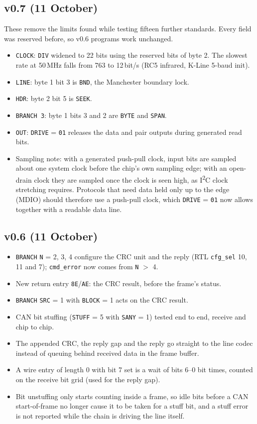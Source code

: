 \documentclass[11pt,a4paper]{article}
\newcommand{\sig}[1]{\texttt{#1}}
\begin{document}
\subsection{v0.7 (11 October)}

These remove the limits found while testing fifteen further standards. Every field was reserved before, so v0.6 programs work unchanged.

\begin{itemize}
\item \sig{CLOCK}: \sig{DIV} widened to 22 bits using the reserved bits of byte 2. The slowest rate at 50\,MHz falls from 763 to 12\,bit/s (RC5 infrared, K-Line 5-baud init).
\item \sig{LINE}: byte 1 bit 3 is \sig{BND}, the Manchester boundary lock.
\item \sig{HDR}: byte 2 bit 5 is \sig{SEEK}.
\item \sig{BRANCH 3}: byte 1 bits 3 and 2 are \sig{BYTE} and \sig{SPAN}.
\item \sig{OUT}: \sig{DRIVE} = \texttt{01} releases the data and pair outputs during generated read bits.
\item Sampling note: with a generated push-pull clock, input bits are sampled about one system clock before the chip's own sampling edge; with an open-drain clock they are sampled once the clock is seen high, as I\textsuperscript{2}C clock stretching requires. Protocols that need data held only up to the edge (MDIO) should therefore use a push-pull clock, which \sig{DRIVE} = \texttt{01} now allows together with a readable data line.
\end{itemize}

\subsection{v0.6 (11 October)}

\begin{itemize}
\item \sig{BRANCH} \sig{N} = 2, 3, 4 configure the CRC unit and the reply (RTL \sig{cfg\_sel} 10, 11 and 7); \sig{cmd\_error} now comes from \sig{N} $>$ 4.
\item New return entry \texttt{8E}/\texttt{AE}: the CRC result, before the frame's status.
\item \sig{BRANCH} \sig{SRC} = 1 with \sig{BLOCK} = 1 acts on the CRC result.
\item CAN bit stuffing (\sig{STUFF} = 5 with \sig{SANY} = 1) tested end to end, receive and chip to chip.
\item The appended CRC, the reply gap and the reply go straight to the line codec instead of queuing behind received data in the frame buffer.
\item A wire entry of length 0 with bit 7 set is a wait of bits 6--0 bit times, counted on the receive bit grid (used for the reply gap).
\item Bit unstuffing only starts counting inside a frame, so idle bits before a CAN start-of-frame no longer cause it to be taken for a stuff bit, and a stuff error is not reported while the chain is driving the line itself.
\end{itemize}
\end{document}
